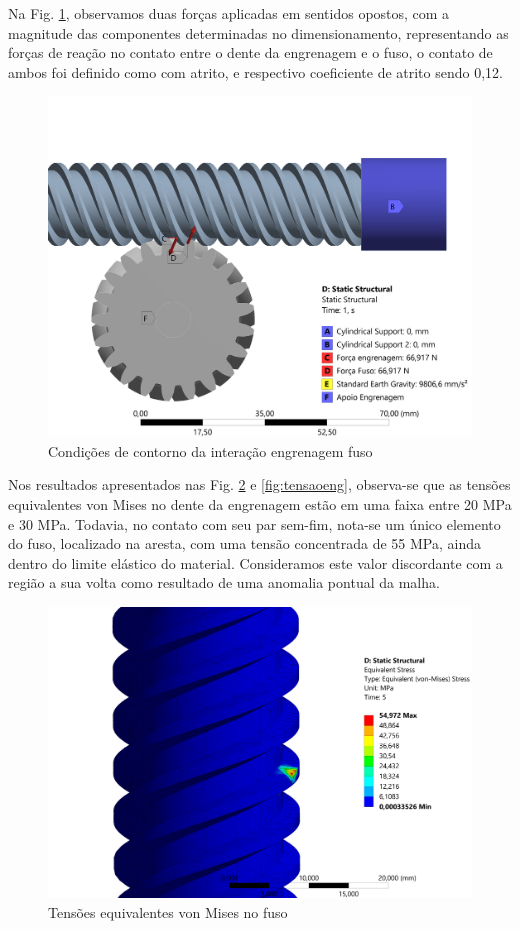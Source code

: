 Na Fig. \ref{fig:condcontorno}, observamos duas forças aplicadas em sentidos opostos, com a magnitude das componentes determinadas no dimensionamento, representando as forças de reação no contato entre o dente da engrenagem e o fuso, o contato de ambos foi definido como com atrito, e respectivo coeficiente de atrito sendo 0,12.

\begin{figure}[ht]
        \centering
        \includegraphics[width=.9\textwidth]{figuras/estrutura/InteracaoFusoEng/PC3 Condicao de contorno.png}
        \caption{Condições de contorno da interação engrenagem fuso}
        \label{fig:condcontorno}
    \end{figure}

Nos resultados apresentados nas Fig. \ref{fig:tensaofuso} e \ref{fig:tensaoeng}, observa-se que as tensões equivalentes von Mises no dente da engrenagem estão em uma faixa entre 20 MPa e 30 MPa. Todavia, no contato com seu par sem-fim, nota-se um único elemento do fuso, localizado na aresta, com uma tensão concentrada de 55 MPa, ainda dentro do limite elástico do material. Consideramos este valor discordante com a região a sua volta como resultado de uma anomalia pontual da malha.

\begin{figure}[ht]
        \centering
        \includegraphics[width=.8\textwidth]{figuras/estrutura/InteracaoFusoEng/tensao fuso.png}
        \caption{Tensões equivalentes von Mises no fuso}
        \label{fig:tensaofuso}
    \end{figure}
    
